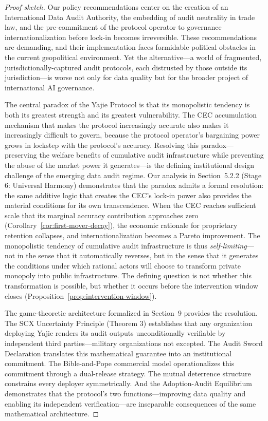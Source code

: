 \documentclass[12pt,a4paper]{ctexart}
\theoremstyle{definition}
\theoremstyle{remark}
\begin{document}
\begin{proof}[Proof sketch]
Our policy recommendations center on the creation of an International Data Audit Authority, the embedding of audit neutrality in trade law, and the pre-commitment of the protocol operator to governance internationalization before lock-in becomes irreversible. These recommendations are demanding, and their implementation faces formidable political obstacles in the current geopolitical environment. Yet the alternative—a world of fragmented, jurisdictionally-captured audit protocols, each distrusted by those outside its jurisdiction—is worse not only for data quality but for the broader project of international AI governance.

The central paradox of the Yajie Protocol is that its monopolistic tendency is both its greatest strength and its greatest vulnerability. The CEC accumulation mechanism that makes the protocol increasingly accurate also makes it increasingly difficult to govern, because the protocol operator's bargaining power grows in lockstep with the protocol's accuracy. Resolving this paradox—preserving the welfare benefits of cumulative audit infrastructure while preventing the abuse of the market power it generates—is the defining institutional design challenge of the emerging data audit regime. Our analysis in Section~5.2.2 (Stage 6: Universal Harmony) demonstrates that the paradox admits a formal resolution: the same additive logic that creates the CEC's lock-in power also provides the material conditions for its own transcendence. When the CEC reaches sufficient scale that its marginal accuracy contribution approaches zero (Corollary~\ref{cor:first-mover-decay}), the economic rationale for proprietary retention collapses, and internationalization becomes a Pareto improvement. The monopolistic tendency of cumulative audit infrastructure is thus \textit{self-limiting}—not in the sense that it automatically reverses, but in the sense that it generates the conditions under which rational actors will choose to transform private monopoly into public infrastructure. The defining question is not whether this transformation is possible, but whether it occurs before the intervention window closes (Proposition~\ref{prop:intervention-window}).

The game-theoretic architecture formalized in Section~9 provides the resolution. The SCX Uncertainty Principle (Theorem 3) establishes that any organization deploying Yajie renders its audit outputs unconditionally verifiable by independent third parties—military organizations not excepted. The Audit Sword Declaration translates this mathematical guarantee into an institutional commitment. The Bible-and-Pope commercial model operationalizes this commitment through a dual-release strategy. The mutual deterrence structure constrains every deployer symmetrically. And the Adoption-Audit Equilibrium demonstrates that the protocol's two functions—improving data quality and enabling its independent verification—are inseparable consequences of the same mathematical architecture.


\end{proof}
\end{document}
